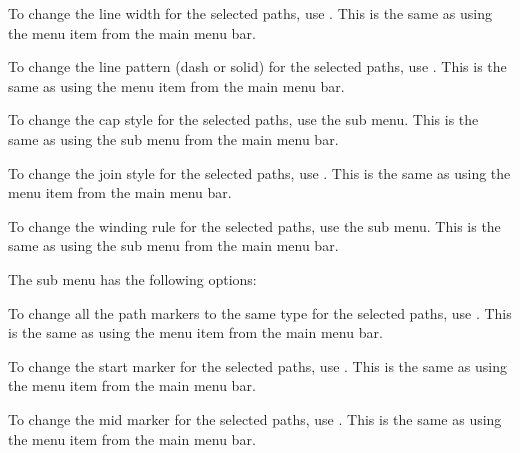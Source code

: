 
To change the line width for the selected paths,
use . This is the same as using the
 menu item from the main menu bar.


To change the line pattern (dash or solid) for the selected paths,
use . This is the same as using the
 menu item from the main menu bar.


To change the cap style for the selected paths,
use the  sub menu. This is the same as using the
 sub menu from the main menu bar.


To change the join style for the selected paths,
use . This is the same as using the
 menu item from the main menu bar.

To change the winding rule for the selected paths,
use the  sub menu. This is the same as using the
 sub menu from the main menu bar.


The  sub menu has the following options:


To change all the path markers to the same type for the selected paths,
use . This is the same as using the
 menu item from the main menu bar.


To change the start marker for the selected paths,
use . This is the same as using the
 menu item from the main menu bar.


To change the mid marker for the selected paths,
use . This is the same as using the
 menu item from the main menu bar.

